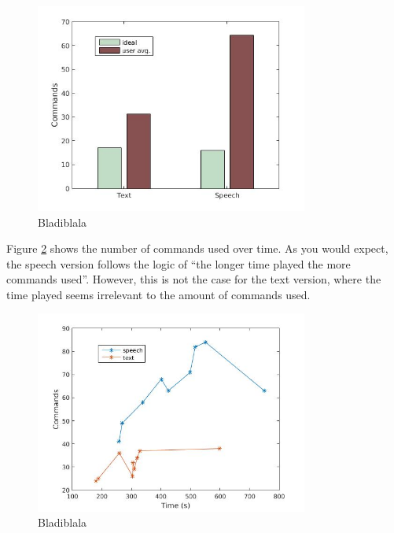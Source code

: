 \begin{figure}[h!]
  \centering
  \includegraphics[width=0.8\textwidth]{images/ideal_cmd.jpg}
  \caption{Bladiblala}\label{ideal_cmd}
\end{figure}

Figure \ref{time_cmd} shows the number of commands used over time. As you would expect, the speech version follows the logic of ``the longer time played the more commands used''. However, this is not the case for the text version, where the time played seems irrelevant to the amount of commands used.

\begin{figure}[h!]
  \centering
  \includegraphics[width=0.8\textwidth]{images/time_cmd.jpg} %
  \caption{Bladiblala}\label{time_cmd}
\end{figure}

